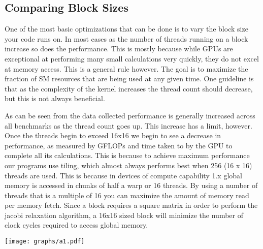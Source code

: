 \documentclass[10pt]{article}
\makeatletter
\newenvironment{figurehere}
{\def\@captype{figure}}
{}
\makeatother
\begin{document}
\begin{multicols}{2}
  \subsection{Comparing Block Sizes}
  One of the most basic optimizations that can be done is to vary the block size your code runs on.
  In most cases as the number of threads running on a block increase so does the performance.
  This is mostly because while GPUs are exceptional at performing many small calculations very quickly, they do not excel at memory access.
  This is a general rule however.
  The goal is to maximize the fraction of SM resources that are being used at any given time.
  One guideline is that as the complexity of the kernel increases the thread count should decrease, but this is not always beneficial.

  As can be seen from the data collected performance is generally increased across all benchmarks as the thread count goes up.
  This increase has a limit, however.
  Once the threads begin to exceed 16x16 we begin to see a decrease in performance, as measured by GFLOPs and time taken to by the GPU to complete all its calculations.
  This is because to achieve maximum performance our programs use tiling, which almost always performs best when 256 (16 x 16) threads are used.
  This is because in devices of compute capability 1.x global memory is accessed in chunks of half a warp or 16 threads.
  By using a number of threads that is a multiple of 16 you can maximize the amount of memory read per memory fetch.
  Since a block requires a square matrix in order to perform the jacobi relaxation algorithm, a 16x16 sized block will minimize the number of clock cycles required to access global memory.


  \begin{figurehere}
    \centering
    \texttt{[image: graphs/a1.pdf]}
    \caption{}
    \label{fig:time_taken1}
  \end{figurehere}


\end{multicols}
\end{document}

